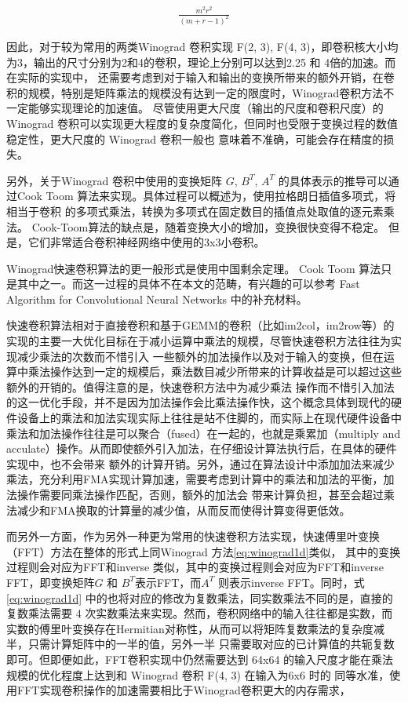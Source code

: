 \begin{align}
  \label{eq:winograd_reduction}
  \frac{m^2r^2}{(m+r-1)^2}
\end{align}

因此，对于较为常用的两类Winograd 卷积实现 F(2, 3), F(4, 3)，即卷积核大小均为3，输出的尺寸分别为2和4的卷积，理论上分别可以达到2.25 和 4倍的加速。而在实际的实现中，
还需要考虑到对于输入和输出的变换所带来的额外开销，在卷积的规模，特别是矩阵乘法的规模没有达到一定的限度时，Winograd卷积方法不一定能够实现理论的加速值。
尽管使用更大尺度（输出的尺度和卷积尺度）的Winograd 卷积可以实现更大程度的复杂度简化，但同时也受限于变换过程的数值稳定性，更大尺度的 Winograd 卷积一般也
意味着不准确，可能会存在精度的损失。

另外，关于Winograd 卷积中使用的变换矩阵 $G$, $B^T$, $A^T$ 的具体表示的推导可以通过Cook Toom 算法来实现。具体过程可以概述为，使用拉格朗日插值多项式，将相当于卷积
的多项式乘法，转换为多项式在固定数目的插值点处取值的逐元素乘法。 Cook-Toom算法的缺点是，随着变换大小的增加，变换很快变得不稳定。 但是，它们非常适合卷积神经网络中使用的3x3小卷积。

Winograd快速卷积算法的更一般形式是使用中国剩余定理。 Cook Toom 算法只是其中之一。而这一过程的具体不在本文的范畴，有兴趣的可以参考 Fast Algorithm for Convolutional 
Neural Networks 中的补充材料。


快速卷积算法相对于直接卷积和基于GEMM的卷积（比如im2col，im2row等）的实现的主要一大优化目标在于减小运算中乘法的规模，尽管快速卷积方法往往为实现减少乘法的次数而不惜引入
一些额外的加法操作以及对于输入的变换，但在运算中乘法操作达到一定的规模后，乘法数目减少所带来的计算收益是可以超过这些额外的开销的。值得注意的是，快速卷积方法中为减少乘法
操作而不惜引入加法的这一优化手段，并不是因为加法操作会比乘法操作快，这个概念具体到现代的硬件设备上的乘法和加法实现实际上往往是站不住脚的，而实际上在现代硬件设备中
乘法和加法操作往往是可以聚合（fused）在一起的，也就是乘累加（multiply and acculate）操作。从而即使额外引入加法，在仔细设计算法执行后，在具体的硬件实现中，也不会带来
额外的计算开销。另外，通过在算法设计中添加加法来减少乘法，充分利用FMA实现计算加速，需要考虑到计算中的乘法和加法的平衡，加法操作需要同乘法操作匹配，否则，额外的加法会
带来计算负担，甚至会超过乘法减少和FMA换取的计算量的减少值，从而反而使得计算变得更低效。

而另外一方面，作为另外一种更为常用的快速卷积方法实现，快速傅里叶变换（FFT）方法在整体的形式上同Winograd 方法\ref{eq:winograd1d}类似，
其中的变换过程则会对应为FFT和inverse 类似，其中的变换过程则会对应为FFT和inverse
 FFT，即变换矩阵$G$ 和 $B^T$表示FFT，而$A^T$ 则表示inverse FFT。同时，式\ref{eq:winograd1d} 中的也将对应的修改为复数乘法，同实数乘法不同的是，直接的复数乘法需要
 4 次实数乘法来实现。然而，卷积网络中的输入往往都是实数，而实数的傅里叶变换存在Hermitian对称性，从而可以将矩阵复数乘法的复杂度减半，只需计算矩阵中的一半的值，另外一半
 只需要取对应的已计算值的共轭复数即可。但即便如此，FFT卷积实现中仍然需要达到 64x64 的输入尺度才能在乘法规模的优化程度上达到和 Winograd 卷积 F(4, 3) 在输入为6x6 时的
 同等水准，使用FFT实现卷积操作的加速需要相比于Winograd卷积更大的内存需求，

